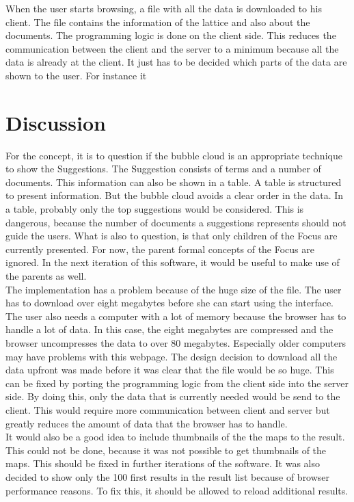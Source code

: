 \documentclass[11pt]{report}
\begin{document}
When the user starts browsing, a  file with all the data is downloaded to his client. The file contains the information of the lattice and also about the documents. The programming logic is done on the client side. This reduces the communication between the client and the server to a minimum because all the data is already at the client. It just has to be decided which parts of the data are shown to the user. For instance it 

\section{Discussion}
\label{fancydis}

For the concept, it is to question if the bubble cloud is an appropriate technique to show the Suggestions. The Suggestion consists of terms and a number of documents. This information can also be shown in a table. A table is structured to present information. But the bubble cloud avoids a clear order in the data. In a table, probably only the top suggestions would be considered. This is dangerous, because the number of documents a suggestions represents should not guide the users. What is also to question, is that only children of the Focus are currently presented. For now, the parent formal concepts of the Focus are ignored. In the next iteration of this software, it would be useful to make use of the parents as well.\\

The implementation has a problem because of the huge size of the  file. The user has to download over eight megabytes before she can start using the interface. The user also needs a computer with a lot of memory because the browser has to handle a lot of data. In this case, the eight megabytes are compressed and the browser uncompresses the data to over 80 megabytes. Especially older computers may have problems with this webpage. The design decision to download all the data upfront was made before it was clear that the  file would be so huge. This can be fixed by porting the programming logic from the client side into the server side. By doing this, only the data that is currently needed would be send to the client. This would require more communication between client and server but greatly reduces the amount of data that the browser has to handle. \\

 It would also be a good idea to include thumbnails of the the maps to the result. This could not be done, because it was not possible to get thumbnails of the maps. This should be fixed in further iterations of the software. It was also decided to show only the 100 first results in the result list because of browser performance reasons. To fix this, it should be allowed to reload additional results.
\end{document}
